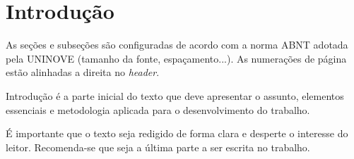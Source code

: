\chapter{Introdução}\label{chp:20_introducao}
\renewcommand{\thesection}{\arabic{chapter}.\arabic{section}}

\begin{resumocapitulo}
As seções e subseções são configuradas de acordo com a norma ABNT adotada pela UNINOVE (tamanho da fonte, espaçamento...). As numerações de página estão alinhadas a direita no \textit{header}.
\end{resumocapitulo}

Introdução é a parte inicial do texto que deve apresentar o assunto, elementos essenciais e metodologia aplicada para o desenvolvimento do trabalho.

É importante que o texto seja redigido de forma clara e desperte o interesse do leitor. Recomenda-se que seja a última parte a ser escrita no trabalho.